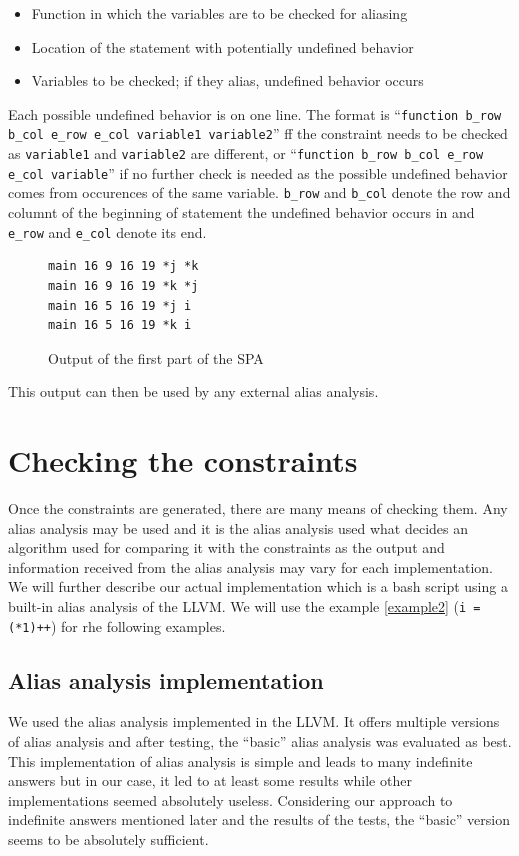 \begin{itemize}
\item Function in which the variables are to be checked for aliasing
\item Location of the statement with potentially undefined behavior
\item Variables to be checked; if they alias, undefined behavior occurs
\end{itemize}

Each possible undefined behavior is on one line. The format is
``\verb|function b_row b_col e_row e_col variable1 variable2|''
ff the constraint needs to be checked as \verb|variable1| and \verb|variable2| are different, or
``\verb|function b_row b_col e_row e_col variable|''
if no further check is needed as the possible undefined behavior comes from occurences of the same variable. \verb|b_row| and \verb|b_col| denote the row and columnt of the beginning of statement the undefined behavior occurs in and \verb|e_row| and \verb|e_col| denote its end.

\begin{figure}
\caption{Output of the first part of the SPA}
\label{first-part-output}
\begin{lstlisting}
main 16 9 16 19 *j *k
main 16 9 16 19 *k *j
main 16 5 16 19 *j i
main 16 5 16 19 *k i
\end{lstlisting}
\end{figure}

This output can then be used by any external alias analysis.

\section{Checking the constraints}
Once the constraints are generated, there are many means of checking them. Any alias analysis may be used and it is the alias analysis used what decides an algorithm used for comparing it with the constraints as the output and information received from the alias analysis may vary for each implementation. We will further describe our actual implementation which is a bash script using a built-in alias analysis of the LLVM. We will use the example \ref{example2} (\verb|i = (*1)++|) for rhe following examples.

\subsection{Alias analysis implementation}
We used the alias analysis implemented in the LLVM. It offers multiple versions of alias analysis and after testing, the ``basic'' alias analysis was evaluated as best. This implementation of alias analysis is simple and leads to many indefinite answers but in our case, it led to at least some results while other implementations seemed absolutely useless. Considering our approach to indefinite answers mentioned later and the results of the tests, the ``basic'' version seems to be absolutely sufficient.

